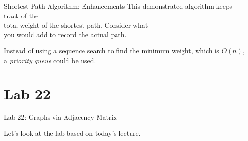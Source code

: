 \documentclass[14pt,aspectratio=1610]{beamer}
\begin{document}


\begin{frame}{Shortest Path Algorithm: Enhancements}
  This demonstrated algorithm keeps track of the\\
  total weight of the shortest path. Consider what\\
  you would add to record the actual path.

  Instead of using a sequence search to find the minimum weight, which is \(O(n)\), a \emph{priority queue} could be used.
\end{frame}

\section*{Lab 22}
\begin{frame}{Lab 22: Graphs via Adjacency Matrix}
\begin{center}\Large
  Let's look at the lab based on today's lecture.
\end{center}
\end{frame}
\end{document}
